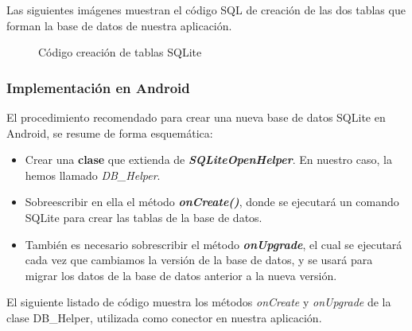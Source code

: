 Las siguientes imágenes muestran el código SQL de creación de las dos tablas que forman la base de datos de nuestra aplicación. 

\begin{figure}[htb]
	\centering

	\caption{Código creación de tablas SQLite}
	\label{fig:sqlite}
\end{figure}

\subsubsection{Implementación en Android}
El procedimiento recomendado para crear una nueva base de datos SQLite en Android, se resume de forma esquemática:
\begin{itemize}
\item Crear una \textbf{clase} que extienda de \textbf{\emph{SQLiteOpenHelper}}. En nuestro caso, la hemos llamado \emph{DB\_Helper}.

\item Sobreescribir en ella el método \textbf{\emph{onCreate()}}, donde se ejecutará un comando SQLite para crear las tablas de la base de datos.

\item También es necesario sobrescribir el método \textbf{\emph{onUpgrade}}, el cual se ejecutará cada vez que cambiamos la versión de la base de datos, y se usará para migrar los datos de la base de datos anterior a la nueva versión. 
\end{itemize}

El siguiente listado de código muestra los métodos \emph{onCreate} y \emph{onUpgrade} de la clase DB\_Helper, utilizada como conector en nuestra aplicación. 






